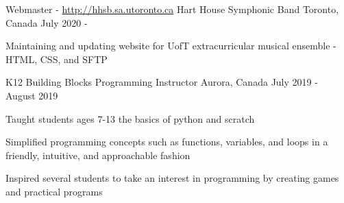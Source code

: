 

\begin{cventries}

  \cventry
  {Webmaster - \url{http://hhsb.sa.utoronto.ca}} %
  {Hart House Symphonic Band} %
  {Toronto, Canada} %
  {July 2020 - } %
  {
    \begin{cvitems} %
      \item {Maintaining and updating website for UofT extracurricular musical ensemble - HTML, CSS, and SFTP}
    \end{cvitems}
  }

  \cventry
  {K12 Building Blocks} %
  {Programming Instructor} %
  {Aurora, Canada} %
  {July 2019 - August 2019} %
  {
    \begin{cvitems} %
      \item {Taught students ages 7-13 the basics of python and scratch}
      \item { Simplified programming concepts such as functions, variables, and loops in a friendly, intuitive, and approachable fashion}
      \item {Inspired several students to take an interest in programming by creating games and practical programs}
    \end{cvitems}
  }

\end{cventries}